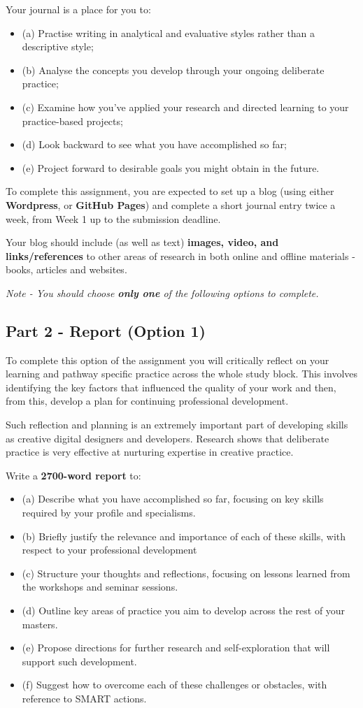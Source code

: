 \documentclass{../../fal_assignment}
\begin{document}
Your journal is a place for you to:
\begin{itemize}
	\item (a) Practise writing in analytical and evaluative styles rather than a descriptive style;
	\item (b) Analyse the concepts you develop through your ongoing deliberate practice;
	\item (c) Examine how you’ve applied your research and directed learning to your practice-based projects;
	\item (d) Look backward to see what you have accomplished so far;
	\item (e) Project forward to desirable goals you might obtain in the future.
\end{itemize}

To complete this assignment, you are expected to set up a blog (using either \textbf{Wordpress}, or \textbf{GitHub Pages}) and complete a short journal entry twice a week, from Week 1 up to the submission deadline.

Your blog should include (as well as text) \textbf{images, video, and links/references} to other areas of research in both online and offline materials - books, articles and websites.

\emph{Note - You should choose \textbf{only one} of the following options to complete.}
	
\subsection*{Part 2 - Report (Option 1)} 

To complete this option of the assignment you will critically reflect on your learning and pathway specific practice across the whole study block. This involves identifying the key factors that influenced the quality of your work and then, from this, develop a plan for continuing professional development.

Such reflection and planning is an extremely important part of developing skills as creative digital designers and developers. Research shows that deliberate practice is very effective at nurturing expertise in creative practice.

Write a \textbf{2700-word report} to:
\begin{itemize}
\item(a) Describe what you have accomplished so far, focusing on key skills required by your profile and specialisms.
\item (b) Briefly justify the relevance and importance of each of these skills, with respect to your professional development
\item(c) Structure your thoughts and reflections, focusing on lessons learned from the workshops and seminar sessions.
\item(d) Outline key areas of practice you aim to develop across the rest of your masters.
\item(e) Propose directions for further research and self-exploration that will support such development.
\item (f) Suggest how to overcome each of these challenges or obstacles, with reference to SMART actions.
\end{itemize}
\end{document}
